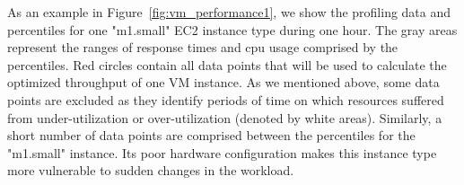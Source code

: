 
As an example in Figure~\ref{fig:vm_performance1}, we show the profiling data and percentiles for one "m1.small" EC2 instance type during one hour. The gray areas represent the ranges of response times and cpu usage comprised by the percentiles. Red circles contain all data points that will be used to calculate the optimized throughput of one VM instance. As we mentioned above, some data points are excluded as they identify periods of time on which resources suffered from under-utilization or over-utilization (denoted by white areas). Similarly, a short number of data points are comprised between the percentiles for the "m1.small" instance. Its poor hardware configuration makes this instance type more vulnerable to sudden changes in the workload.



